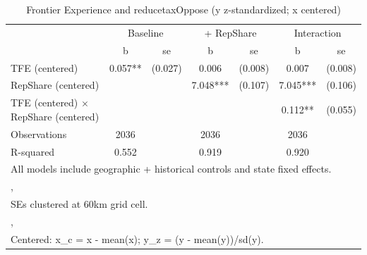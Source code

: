 \begin{table}[htbp]\centering
\def\sym#1{\ifmmode^{#1}\else\(^{#1}\)\fi}
\caption{Frontier Experience and reducetaxOppose (y z-standardized; x centered)}
\begin{tabular}{l*{3}{cc}}
\toprule
                &\multicolumn{2}{c}{Baseline}&\multicolumn{2}{c}{ + RepShare}&\multicolumn{2}{c}{Interaction}\\
                &        b   &       se&        b   &       se&        b   &       se\\
\midrule
TFE (centered)  &    0.057** &  (0.027)&    0.006   &  (0.008)&    0.007   &  (0.008)\\
RepShare (centered)&            &         &    7.048***&  (0.107)&    7.045***&  (0.106)\\
TFE (centered) $\times$ RepShare (centered)&            &         &            &         &    0.112** &  (0.055)\\
\midrule
Observations    &     2036   &         &     2036   &         &     2036   &         \\
R-squared       &    0.552   &         &    0.919   &         &    0.920   &         \\
\bottomrule
\multicolumn{7}{l}{\footnotesize All models include geographic + historical controls and state fixed effects.}\\
\multicolumn{7}{l}{\footnotesize ,}\\
\multicolumn{7}{l}{\footnotesize SEs clustered at 60km grid cell.}\\
\multicolumn{7}{l}{\footnotesize ,}\\
\multicolumn{7}{l}{\footnotesize Centered: x\_c = x - mean(x); y\_z = (y - mean(y))/sd(y).}\\
\end{tabular}
\end{table}
